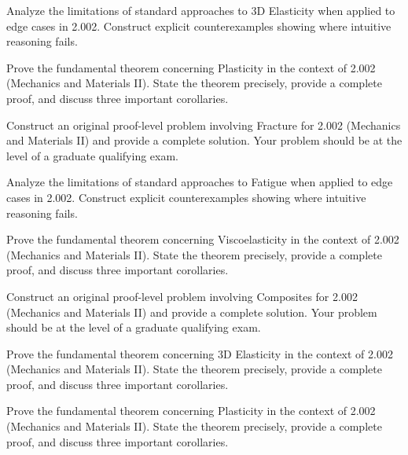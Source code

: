 \documentclass[12pt,a4paper]{exam}
\begin{document}
\begin{questions}

\question[5]
Analyze the limitations of standard approaches to 3D Elasticity when applied to edge cases in 2.002. Construct explicit counterexamples showing where intuitive reasoning fails.

\vspace{0.3cm}

\question[3]
Prove the fundamental theorem concerning Plasticity in the context of 2.002 (Mechanics and Materials II). State the theorem precisely, provide a complete proof, and discuss three important corollaries.

\vspace{0.3cm}

\question[6]
Construct an original proof-level problem involving Fracture for 2.002 (Mechanics and Materials II) and provide a complete solution. Your problem should be at the level of a graduate qualifying exam.

\vspace{0.3cm}

\question[5]
Analyze the limitations of standard approaches to Fatigue when applied to edge cases in 2.002. Construct explicit counterexamples showing where intuitive reasoning fails.

\vspace{0.3cm}

\question[5]
Prove the fundamental theorem concerning Viscoelasticity in the context of 2.002 (Mechanics and Materials II). State the theorem precisely, provide a complete proof, and discuss three important corollaries.

\vspace{0.3cm}

\question[3]
Construct an original proof-level problem involving Composites for 2.002 (Mechanics and Materials II) and provide a complete solution. Your problem should be at the level of a graduate qualifying exam.

\vspace{0.3cm}

\question[3]
Prove the fundamental theorem concerning 3D Elasticity in the context of 2.002 (Mechanics and Materials II). State the theorem precisely, provide a complete proof, and discuss three important corollaries.

\vspace{0.3cm}

\question[4]
Prove the fundamental theorem concerning Plasticity in the context of 2.002 (Mechanics and Materials II). State the theorem precisely, provide a complete proof, and discuss three important corollaries.


\end{questions}
\end{document}
